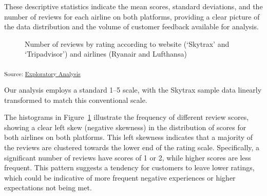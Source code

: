 \documentclass[
]{agujournal2019}
\begin{document}
These descriptive statistics indicate the mean scores, standard
deviations, and the number of reviews for each airline on both
platforms, providing a clear picture of the data distribution and the
volume of customer feedback available for analysis.

\begin{figure}[H]


\caption{\label{fig-histogram}Number of reviews by rating according to
website (`Skytrax' and `Tripadvisor') and airlines (Ryanair and
Lufthansa)}

\end{figure}%

\textsubscript{Source:
\href{https://chrglez.github.io/hierarchical_bayesian_airlines/notebooks/exploratory-analysis-preview.html\#cell-fig-histogram}{Exploratory
Analysis}}

Our analysis employs a standard 1--5 scale, with the Skytrax sample data
linearly transformed to match this conventional scale.

The histograms in Figure~\ref{fig-histogram} illustrate the frequency of
different review scores, showing a clear left skew (negative skewness)
in the distribution of scores for both airlines on both platforms. This
left skewness indicates that a majority of the reviews are clustered
towards the lower end of the rating scale. Specifically, a significant
number of reviews have scores of 1 or 2, while higher scores are less
frequent. This pattern suggests a tendency for customers to leave lower
ratings, which could be indicative of more frequent negative experiences
or higher expectations not being met.
\end{document}
